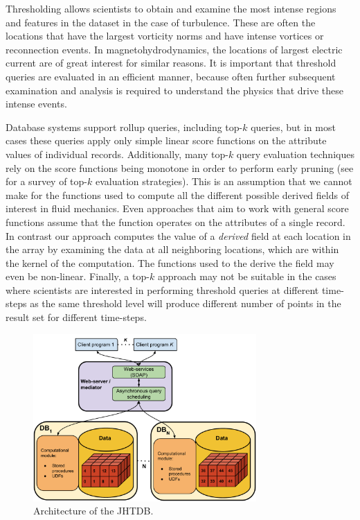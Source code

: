 \documentclass{sig-alternate}
\begin{document}
Thresholding allows scientists to obtain and examine the most intense regions and features in the dataset in the case of turbulence. 
These are often the locations that have the largest vorticity norms and have intense vortices or reconnection events. 
In magnetohydrodynamics, the locations of largest electric current are of great interest for similar reasons.
It is important that threshold queries are evaluated in an efficient manner, because often further subsequent examination
and analysis is required to understand the physics that drive these intense events. 

Database systems support rollup queries, including top-$k$ queries, but in most cases these
queries apply only simple linear score functions on the attribute values of individual records.
Additionally, many top-$k$ query evaluation techniques rely on the score functions being monotone in order to perform early pruning (see \cite{Ilyas} for a
survey of top-$k$ evaluation strategies).
This is an assumption that we cannot make for the functions used to compute all the different possible derived fields of interest in fluid mechanics.
Even approaches that aim to work with general score functions \cite{Deshpande, Xin} assume that the function operates on the attributes of a single record.
In contrast our approach computes the value of a \emph{derived} field at each location in the array by examining the data at all neighboring locations, which
are within the kernel of the computation. The functions used to the derive the field may even be non-linear.
Finally, a top-$k$ approach may not be suitable in the cases where scientists are interested in performing threshold queries at different time-steps as the
same threshold level will produce different number of points in the result set for different time-steps.

\begin{figure}
\centering
\includegraphics[width=3.35in]{Figures/jhtdb_diagram.pdf}
\caption{Architecture of the JHTDB.}
\label{fig:jhtdb_diagram}
\end{figure}
\end{document}
